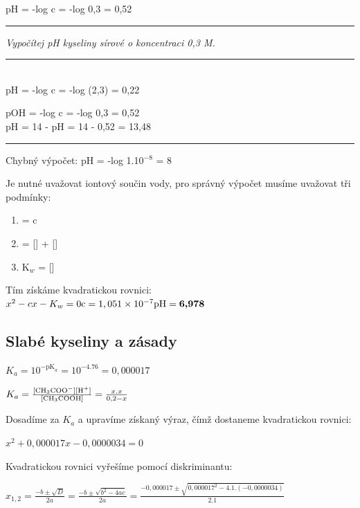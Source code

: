 pH = -log c = -log 0,3 = 0,52\\
\hrule
\textit{Vypočítej pH kyseliny sírové o koncentraci 0,3 M.}
\hrule
{}\\
pH = -log c = -log (2,3) = 0,22



pOH = -log c = -log 0,3 = 0,52\\
pH = 14 - pH = 14 - 0,52 = 13,48
\hrule
\newpage
{}

Chybný výpočet: pH = -log 1.10$^{-8}$ = 8

Je nutné uvažovat iontový součin vody, pro správný výpočet musíme uvažovat tři podmínky:

\begin{enumerate}
	\item \ce{[Cl^-]} = c
	\item \ce{[H+]} = [] + []
	\item K$_w$ = \ce{[H+]}[]
\end{enumerate}

Tím získáme kvadratickou rovnici:\\
$x^2 - cx - K_w = 0\\
\textrm{c} = 1,051\times10^{-7}\\
\textrm{pH} = \textbf{6,978}$


\newpage

\subsection{Slabé kyseliny a zásady}


$K_a = 10^{-\textrm{pK}_a} = 10^{-4.76} = 0,000017$

$K_a = \frac{[\ce{CH3COO^-}][\ce{H^+}]}{[\ce{CH3COOH}]} = \frac{x.x}{0,2-x}$

Dosadíme za $K_a$ a upravíme získaný výraz, čímž dostaneme kvadratickou rovnici:

$x^2 + 0,000017x - 0,0000034 = 0$

Kvadratickou rovnici vyřešíme pomocí diskriminantu:

$x_{1,2} = \frac{-b \pm \sqrt{D}}{2a} = \frac{-b \pm \sqrt{b^2 - 4ac}}{2a} = \frac{-0,000017 \pm \sqrt{0,000017^2 - 4.1.(-0,0000034)}}{2.1}$

